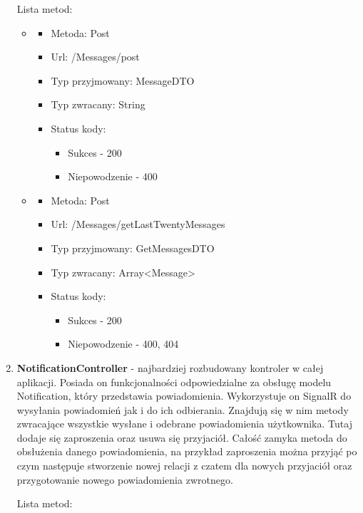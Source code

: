 \documentclass[12pt,a4paper]{article}
\begin{document}
\begin{enumerate}
	Lista metod:
	\begin{itemize}
		
		\item 
		\begin{itemize}
			\item Metoda: Post
			\item Url: /Messages/post
			\item Typ przyjmowany: MessageDTO
			\item Typ zwracany: String
			\item Status kody: 
			\begin{itemize}
				\item Sukces - 200
				\item Niepowodzenie - 400
			\end{itemize}
		\end{itemize}
	
		\item 
		\begin{itemize}
			\item Metoda: Post
			\item Url: /Messages/getLastTwentyMessages
			\item Typ przyjmowany: GetMessagesDTO
			\item Typ zwracany: Array<Message>
			\item Status kody: 
			\begin{itemize}
				\item Sukces - 200
				\item Niepowodzenie - 400, 404
			\end{itemize}
		\end{itemize}
	\end{itemize}
	
	\item \textbf{NotificationController} - najbardziej rozbudowany kontroler w całej aplikacji. Posiada on funkcjonalności odpowiedzialne za obsługę modelu Notification, który przedstawia powiadomienia. Wykorzystuje on SignalR do wysyłania powiadomień jak i do ich odbierania. Znajdują się w nim metody zwracające wszystkie wysłane i odebrane powiadomienia użytkownika. Tutaj dodaje się zaproszenia oraz usuwa się przyjaciół. Całość zamyka metoda do obsłużenia danego powiadomienia, na przykład zaproszenia można przyjąć po czym następuje stworzenie nowej relacji z czatem dla nowych przyjaciół oraz przygotowanie nowego powiadomienia zwrotnego.
	
	Lista metod:
	\begin{itemize}
		

\end{itemize}
\end{enumerate}
\end{document}
